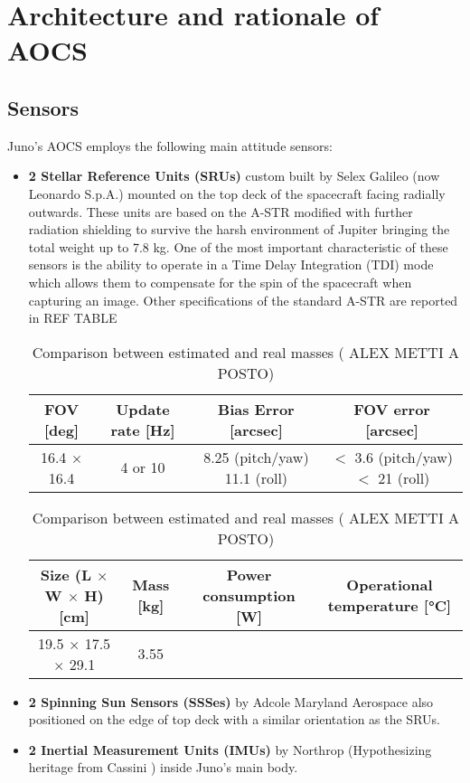 \section{Architecture and rationale of AOCS}
\label{sec:AOCS_architecture_rationale}



\subsection{Sensors}
\label{subsec:Sensors}

Juno's AOCS employs the following main attitude sensors:

\begin{itemize}
    \item \textbf{2 Stellar Reference Units (SRUs)} custom built by Selex Galileo (now Leonardo S.p.A.) mounted on the top deck of the spacecraft facing radially outwards. These units are based on the A-STR \mref modified with further radiation shielding to survive the harsh environment of Jupiter bringing the total weight up to 7.8 kg. One of the most important characteristic of these sensors is the ability to operate in a Time Delay Integration (TDI) mode which allows them to compensate for the spin of the spacecraft when capturing an image. Other specifications of the standard A-STR are reported in REF TABLE
    \begin{table}[H]
        \renewcommand{\arraystretch}{1.3}
        \centering
        \begin{tabular}{|c|c|c|c|}
            \hline
            \textbf{FOV [deg]} & \textbf{Update rate [Hz]} & \textbf{Bias Error [arcsec]} & \textbf{FOV error [arcsec]} \\
            \hline
            16.4 $\times$ 16.4 & 4 or 10 & 8.25 (pitch/yaw) 11.1 (roll) & $<$ 3.6 (pitch/yaw) $<$ 21 (roll) \\   
            \hline
        \end{tabular}

        \vspace{5mm}

        \begin{tabular}{|c|c|c|c|}
            \hline
            \textbf{Size (L $\boldsymbol{\times}$ W $\boldsymbol{\times}$ H) [cm]} & \textbf{Mass [kg]} & \textbf{Power consumption [W]} & \textbf{Operational temperature [°C]} \\
            \hline
            19.5 $\times$ 17.5 $\times$ 29.1 & 3.55 & \\
            \hline
        \end{tabular}
        \caption{Comparison between estimated and real masses ( ALEX METTI A POSTO)}
        \label{table:masses}
    \end{table}
 
    \item \textbf{2 Spinning Sun Sensors (SSSes)} by Adcole Maryland Aerospace also positioned on the edge of top deck with a similar orientation as the SRUs. 
    \item \textbf{2 Inertial Measurement Units (IMUs)} by Northrop (Hypothesizing heritage from Cassini \mref) inside Juno's main body. 
\end{itemize}

